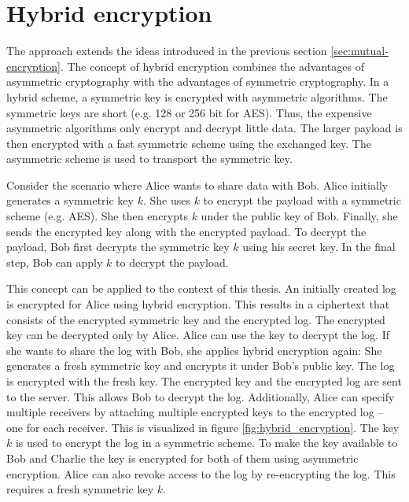 \documentclass[../main.tex]{subfiles}
\begin{document}
\section{Hybrid encryption}
\label{sec:hybrid-encryption}

The approach extends the ideas introduced in the previous section \ref{sec:mutual-encryption}.
The concept of hybrid encryption combines the advantages of asymmetric cryptography with the advantages of symmetric cryptography.
In a hybrid scheme, a symmetric key is encrypted with asymmetric algorithms.
The symmetric keys are short (e.g. 128 or 256 bit for AES).
Thus, the expensive asymmetric algorithms only encrypt and decrypt little data.
The larger payload is then encrypted with a fast symmetric scheme using the exchanged key.
The asymmetric scheme is used to transport the symmetric key.~\cite[340]{Eckert2018}

Consider the scenario where Alice wants to share data with Bob.
Alice initially generates a symmetric key $k$.
She uses $k$ to encrypt the payload with a symmetric scheme (e.g. AES).
She then encrypts $k$ under the public key of Bob.
Finally, she sends the encrypted key along with the encrypted payload.
To decrypt the payload, Bob first decrypts the symmetric key $k$ using his secret key.
In the final step, Bob can apply $k$ to decrypt the payload.

This concept can be applied to the context of this thesis.
An initially created log is encrypted for Alice using hybrid encryption.
This results in a ciphertext that consists of the encrypted symmetric key and the encrypted log.
The encrypted key can be decrypted only by Alice.
Alice can use the key to decrypt the log.
If she wants to share the log with Bob, she applies hybrid encryption again:
She generates a fresh symmetric key and encrypts it under Bob's public key.
The log is encrypted with the fresh key.
The encrypted key and the encrypted log are sent to the server.
This allows Bob to decrypt the log.
Additionally, Alice can specify multiple receivers by attaching multiple encrypted keys to the encrypted log -- one for each receiver.
This is visualized in figure \ref{fig:hybrid_encryption}. 
The key $k$ is used to encrypt the log in a symmetric scheme.
To make the key available to Bob and Charlie the key is encrypted for both of them using asymmetric encryption.
Alice can also revoke access to the log by re-encrypting the log. 
This requires a fresh symmetric key $k$.
\end{document}
